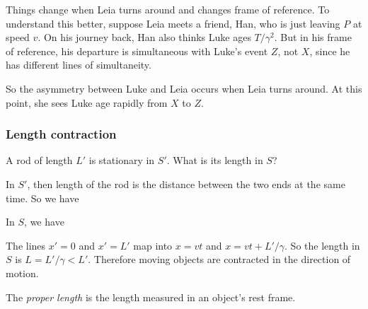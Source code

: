 \documentclass[a4paper]{article}
\begin{document}
Things change when Leia turns around and changes frame of reference. To understand this better, suppose Leia meets a friend, Han, who is just leaving $P$ at speed $v$. On his journey back, Han also thinks Luke ages $T/\gamma^2$. But in his frame of reference, his departure is simultaneous with Luke's event $Z$, not $X$, since he has different lines of simultaneity. 

So the asymmetry between Luke and Leia occurs when Leia turns around. At this point, she sees Luke age rapidly from $X$ to $Z$.

\subsubsection*{Length contraction}
A rod of length $L'$ is stationary in $S'$. What is its length in $S$?

In $S'$, then length of the rod is the distance between the two ends at the same time. So we have
\begin{center}
\end{center}

In $S$, we have
\begin{center}
\end{center}
The lines $x' = 0$ and $x' = L'$ map into $x = vt$ and $x = vt + L'/\gamma$. So the length in $S$ is $L = L'/\gamma < L'$. Therefore moving objects are contracted in the direction of motion.
\begin{defi}
  The \emph{proper length} is the length measured in an object's rest frame.
\end{defi}
\end{document}

